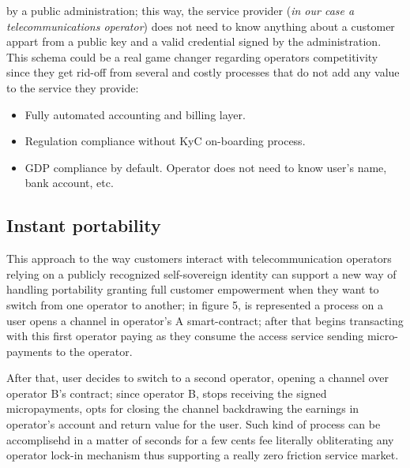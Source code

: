 \documentclass[12pt]{amsart}
\begin{document}
\begin{multicols}{2}
by a public administration; this way, the service provider (\textit{in
  our case a telecommunications operator}) does not need to know
anything about a customer appart from a public key and a valid
credential signed by the administration. This schema could be a real game
changer regarding operators competitivity since they get rid-off
from several and costly processes that do not add any value to the service
they provide:

\begin{itemize}
\item Fully automated accounting and billing layer.
\item Regulation compliance without KyC on-boarding process.
\item GDP compliance by default. Operator does not need to know
  user's name, bank account, etc.
\end{itemize}

\subsection{Instant portability}

\vspace{0.35cm}

This approach to the way customers interact with telecommunication
operators relying on a publicly recognized self-sovereign identity
can support a new way of handling portability granting full customer
empowerment when they want to switch from one operator to another;
in figure 5, is represented a process on a user opens a channel
in operator's A smart-contract; after that begins transacting with
this first operator paying as they consume the access service
sending micro-payments to the operator.

\vspace{0.35cm}

After that, user decides to switch to a second operator, opening a channel
over operator B's contract; since operator B, stops receiving the signed
micropayments, opts for closing the channel backdrawing the earnings in operator's
account and return value for the user. Such kind of process can be accomplisehd
in a matter of seconds for a few cents fee literally obliterating any
operator lock-in mechanism thus supporting a really zero friction service market.

\end{multicols}
\end{document}
